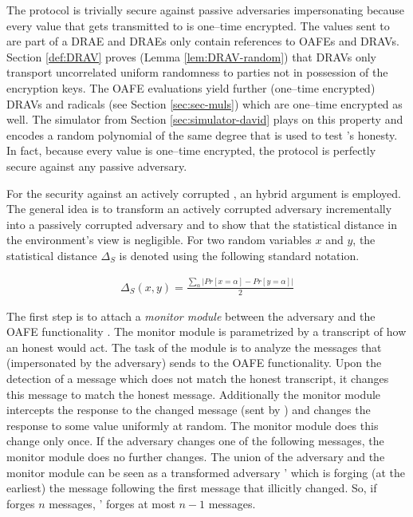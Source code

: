 The protocol is trivially secure against passive adversaries impersonating
\JWpTwo{} because every value that gets transmitted to \JWpTwo{} is one--time
encrypted. The values sent to \JWpTwo{} are part of a DRAE and DRAEs only
contain references to OAFEs and DRAVs. Section \ref{def:DRAV} proves (Lemma
\ref{lem:DRAV-random}) that DRAVs only transport uncorrelated uniform randomness
to parties not in possession of the encryption keys. The OAFE evaluations yield
further (one--time encrypted) DRAVs and radicals (see Section
\ref{sec:sec-muls}) which are one--time encrypted as well. The simulator from
Section \ref{sec:simulator-david} plays on this property and encodes a random
polynomial of the same degree that is used to test \JWpTwo{}'s honesty. In fact,
because every value is one--time encrypted, the protocol is perfectly secure
against any passive adversary.

For the security against an actively corrupted \JWpTwo{}, an hybrid argument is
employed. The general idea is to transform an actively corrupted adversary
incrementally into a passively corrupted adversary and to show that the
statistical distance in the environment's view is negligible. For two random
variables $x$ and $y$, the statistical distance $\Delta_S$ is denoted using the
following standard notation.

\begin{align*}
  \Delta_S(x,y) = \frac{\sum_\alpha \left|Pr[x=\alpha] - Pr[y=\alpha]\right|}{2}
\end{align*}

\noindent{}The first step is to attach a \emph{monitor module} between the
adversary \JWadv{} and the OAFE functionality \JWfuncSymOAFE{}. The monitor
module is parametrized by a transcript of how an honest \JWpTwo{} would act. The
task of the module is to analyze the messages that \JWpTwo{} (impersonated by
the adversary) sends to the OAFE functionality. Upon the detection of a message
which does not match the honest transcript, it changes this message to match the
honest message. Additionally the monitor module intercepts the response to
the changed message (sent by \JWfuncSymOAFE{}) and changes the response to some
value uniformly at random. The monitor module does this change only once. If the
adversary changes one of the following messages, the monitor module does no
further changes. The union of the adversary \JWadv{} and the
monitor module can be seen as a transformed adversary \JWadv{}' which is forging
(at the earliest) the message following the first message that \JWadv{}
illicitly changed. So, if \JWadv{} forges $n$ messages, \JWadv{}' forges at
most $n-1$ messages.

